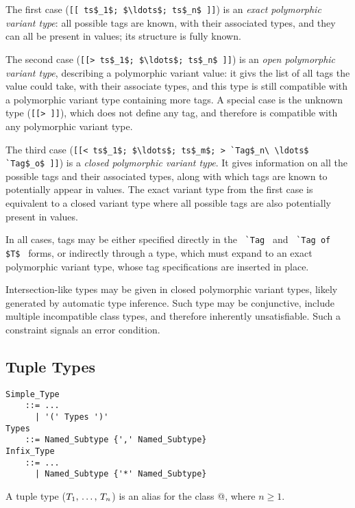 The first case (\lstinline![[ ts$_1$; $\ldots$; ts$_n$ ]]!) is an {\em exact polymorphic variant type}: all possible tags are known, with their associated types, and they can all be present in values; its structure is fully known. 

The second case (\lstinline![[> ts$_1$; $\ldots$; ts$_n$ ]]!) is an {\em open polymorphic variant type}, describing a polymorphic variant value: it givs the list of all tags the value could take, with their associate types, and this type is still compatible with a polymorphic variant type containing more tags. A special case is the unknown type (\lstinline![[> ]]!), which does not define any tag, and therefore is compatible with any polymorphic variant type. 

The third case (\lstinline![[< ts$_1$; $\ldots$; ts$_m$; > `Tag$_n\ \ldots$ `Tag$_o$ ]]!) is a {\em closed polymorphic variant type}. It gives information on all the possible tags and their associated types, along with which tags are known to potentially appear in values. The exact variant type from the first case is equivalent to a closed variant type where all possible tags are also potentially present in values. 

In all cases, tags may be either specified directly in the ~\lstinline!`Tag!~ and ~\lstinline!`Tag of $T$!~ forms, or indirectly through a type, which must expand to an exact polymorphic variant type, whose tag specifications are inserted in place. 

Intersection-like types may be given in closed polymorphic variant types, likely generated by automatic type inference. Such type may be conjunctive, include multiple incompatible class types, and therefore inherently unsatisfiable. Such a constraint signals an error condition. 





\subsection{Tuple Types}
\label{sec:tuple-types}

\grammar\begin{lstlisting}
Simple_Type 
    ::= ...
      | '(' Types ')'
Types
    ::= Named_Subtype {',' Named_Subtype}
Infix_Type 
    ::= ...
      | Named_Subtype {'*' Named_Subtype}
\end{lstlisting}

A tuple type ($T_1 \commadots T_n$) is an alias for the class \lstinline@Tuple[$T_1 \commadots T_n$]@, where $n \geq 1$. 

